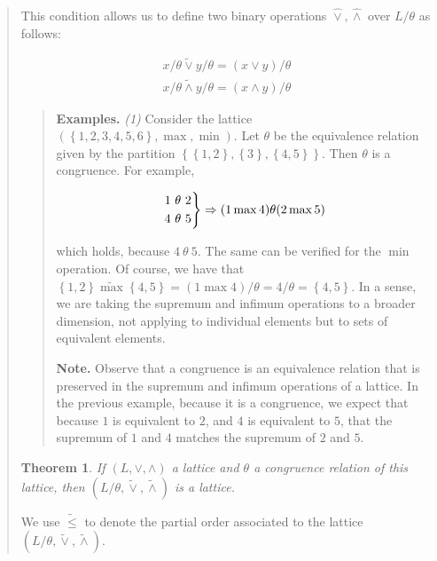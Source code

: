\documentclass[a4paper, 12pt]{article}
\newtheorem{theorem}{Theorem}
\newtheorem{theorem}{Theorem}
\begin{document}
\begin{quote}
This condition allows us to define two binary operations $\hat{\lor },
\hat{\land }$ over $L / \theta$ as follows: 

\begin{align*}
    x / \theta \widetilde{\lor } y / \theta = (x \lor y) / \theta\\
    x / \theta \widetilde{\land  } y / \theta = (x \land  y) / \theta
\end{align*}


\small
\begin{quote}

\textbf{Examples.} \textit{(1)} Consider the lattice $\left( \left\{ 1, 2, 3, 4,
5, 6\right\}, \max, \min  \right) $. Let $\theta$ be the equivalence relation
given by the partition $\left\{ \left\{ 1, 2 \right\}, \left\{ 3 \right\},
\left\{ 4, 5 \right\}   \right\} $. Then $\theta$ is a congruence. For example, 

\begin{align*}
    \begin{rcases*}
        1 ~\theta~ 2 \\ 
        4 ~\theta~ 5
    \end{rcases*} \Rightarrow (1 \max 4) \theta (2 \max 5)
\end{align*}

which holds, because $4 ~ \theta ~ 5$. The same can be verified for the $\min$
operation. Of course, we have that $\left\{ 1, 2 \right\} \widetilde{\max}
\left\{ 4, 5 \right\} = (1 \max  4) / \theta = 4 / \theta = \left\{ 4, 5
\right\} $. In a sense, we are taking the supremum and infimum operations to a
broader dimension, not applying to individual elements but to sets of equivalent
elements.

\textbf{Note.} Observe that a congruence is an equivalence relation that is
preserved in the supremum and infimum operations of a lattice. In the previous
example, because it is a congruence, we expect that because $1$ is equivalent to
$2$, and $4$ is equivalent to $5$, that the supremum of $1$ and $4$ matches the
supremum of $2$ and $5$.

\end{quote}
\normalsize

\begin{theorem}
    If $(L, \lor , \land )$ a lattice and $\theta$ a congruence relation of this
    lattice, then $(L / \theta, \widetilde{ \lor  }, \widetilde{ \land  }  )$ is
    a lattice.
\end{theorem}

We use $\widetilde{ \leq } $ to denote the partial order associated to the
lattice $(L / \theta, \widetilde{ \lor  }, \widetilde{ \land  }  )$.


\end{quote}
\end{document}

